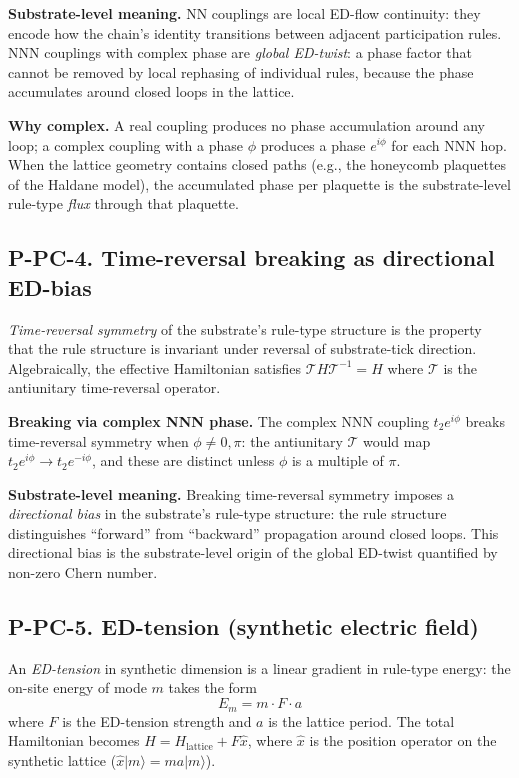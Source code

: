 \documentclass[11pt,a4paper]{article}
\begin{document}
\textbf{Substrate-level meaning.} NN couplings are local ED-flow continuity: they encode how the chain's identity transitions between adjacent participation rules. NNN couplings with complex phase are \emph{global ED-twist}: a phase factor that cannot be removed by local rephasing of individual rules, because the phase accumulates around closed loops in the lattice.

\textbf{Why complex.} A real coupling produces no phase accumulation around any loop; a complex coupling with a phase $\phi$ produces a phase $e^{i\phi}$ for each NNN hop. When the lattice geometry contains closed paths (e.g., the honeycomb plaquettes of the Haldane model), the accumulated phase per plaquette is the substrate-level rule-type \emph{flux} through that plaquette.

\subsection{P-PC-4. Time-reversal breaking as directional ED-bias}

\emph{Time-reversal symmetry} of the substrate's rule-type structure is the property that the rule structure is invariant under reversal of substrate-tick direction. Algebraically, the effective Hamiltonian satisfies $\mathcal{T} H \mathcal{T}^{-1} = H$ where $\mathcal{T}$ is the antiunitary time-reversal operator.

\textbf{Breaking via complex NNN phase.} The complex NNN coupling $t_2 e^{i\phi}$ breaks time-reversal symmetry when $\phi \neq 0, \pi$: the antiunitary $\mathcal{T}$ would map $t_2 e^{i\phi} \to t_2 e^{-i\phi}$, and these are distinct unless $\phi$ is a multiple of $\pi$.

\textbf{Substrate-level meaning.} Breaking time-reversal symmetry imposes a \emph{directional bias} in the substrate's rule-type structure: the rule structure distinguishes ``forward'' from ``backward'' propagation around closed loops. This directional bias is the substrate-level origin of the global ED-twist quantified by non-zero Chern number.

\subsection{P-PC-5. ED-tension (synthetic electric field)}

An \emph{ED-tension} in synthetic dimension is a linear gradient in rule-type energy: the on-site energy of mode $m$ takes the form
\[
E_m = m \cdot F \cdot a
\]
where $F$ is the ED-tension strength and $a$ is the lattice period. The total Hamiltonian becomes $H = H_{\mathrm{lattice}} + F\hat x$, where $\hat x$ is the position operator on the synthetic lattice ($\hat x|m\rangle = ma|m\rangle$).
\end{document}
